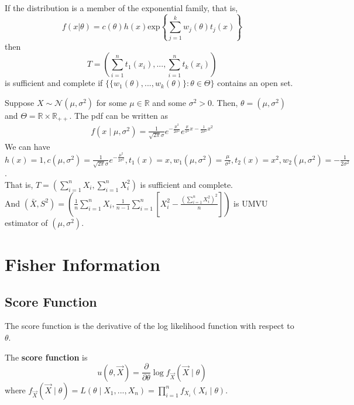 \documentclass[11pt]{elegantbook}
\begin{document}
\begin{theorem}\label{comp_exp_fam}
    If the distribution is a member of the exponential family, that is, $$f(x|\theta)=c(\theta)h(x)\text{exp}\left\{\sum_{j=1}^k w_j(\theta) t_j(x)\right\}$$ then $$T=\left(\sum_{i=1}^n t_1(x_i),...,\sum_{i=1}^n t_k(x_i)\right)$$ is sufficient and complete if $\{\{w_1(\theta),...,w_k(\theta)\}:\theta\in\Theta\}$ contains an open set.
\end{theorem}
\begin{example}
    Suppose $X\sim \mathcal{N}(\mu,\sigma^2)$ for some $\mu\in \mathbb{R}$ and some $\sigma^2>0$. Then, $\theta=(\mu,\sigma^2)$ and $\Theta=\mathbb{R}\times \mathbb{R}_{++}$. The pdf can be written as
    \begin{equation}
        \begin{aligned}
            f(x\mid \mu,\sigma^2)=\frac{1}{\sqrt{2\pi}\sigma}e^{-\frac{\mu^2}{2\sigma^2}}e^{\frac{\mu}{\sigma^2}x-\frac{1}{2\sigma^2}x^2}
        \end{aligned}
        \nonumber
    \end{equation}
    We can have $h(x)=1, c(\mu,\sigma^2)=\frac{1}{\sqrt{2\pi}\sigma}e^{-\frac{\mu^2}{2\sigma^2}}, t_1(x)=x, w_1(\mu,\sigma^2)=\frac{\mu}{\sigma^2}, t_2(x)=x^2, w_2(\mu,\sigma^2)=-\frac{1}{2\sigma^2}$.\\
    That is, $T=\left(\sum_{i=1}^n X_i, \sum_{i=1}^n X_i^2\right)$ is sufficient and complete.\\
    And $\left(\bar{X},S^2\right)=\left(\frac{1}{n}\sum_{i=1}^n X_i,\frac{1}{n-1}\sum_{i=1}^n\left[X_i^2-\frac{(\sum_{i=1}^n X_i^2)^2}{n}\right]\right)$ is UMVU estimator of $(\mu,\sigma^2)$.
\end{example}





\section{Fisher Information}
\subsection{Score Function}
The score function is the derivative of the log likelihood function with respect to $\theta$.
\begin{definition}
    \normalfont
    The \textbf{score function} is $$u(\theta,\vec{X})=\frac{\partial}{\partial \theta}\log f_{\vec{X}}(\vec{X}\mid\theta)$$
    where $f_{\vec{X}}(\vec{X}\mid\theta)=L(\theta\mid X_1,...,X_n)=\prod_{i=1}^n f_{X_i}(X_i\mid\theta)$.
\end{definition}
\end{document}
